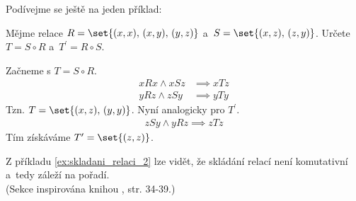 Podívejme se ještě na jeden příklad:
\begin{example}\label{ex:skladani_relaci_2}
    Mějme relace $R=\set{(x,x),\,(x,y),\,(y,z)}$ a~$S=\set{(x,z),\,(z,y)}$. Určete $T=S\circ R$ a~$T^\prime=R\circ S$.
\end{example}
\begin{solution}
    Začneme s $T=S\circ R$.
    \begin{align*}
        xRx \land xSz &\implies xTz\\
        yRz \land zSy &\implies yTy
    \end{align*}
    Tzn. $T=\set{(x,z),\,(y,y)}$. Nyní analogicky pro $T^\prime$.
    \begin{align*}
        zSy \land yRz \implies zTz
    \end{align*}
    Tím získáváme $T^\prime=\set{(z,z)}$.
\end{solution}
Z příkladu \ref{ex:skladani_relaci_2} lze vidět, že skládání relací není komutativní a~tedy záleží na pořadí.\\
(Sekce inspirována knihou \cite{MatousekNesetril2009}, str. 34-39.)